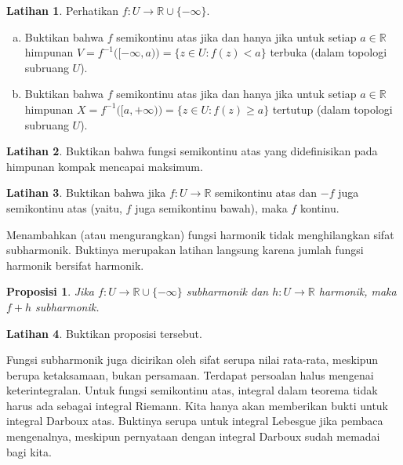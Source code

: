 \documentclass[12pt,openany]{book}
\newcommand{\R}{{\mathbb{R}}}
\theoremstyle{plain}
\newtheorem{prop}[thm]{Proposisi}
\theoremstyle{remark}
\theoremstyle{definition}
\newenvironment{exbox}{%
    \def\FrameCommand{\vrule width 1pt \relax\hspace{10pt}}%
    \MakeFramed{\advance\hsize-\width\FrameRestore}%
}{%
    \endMakeFramed
}
\newenvironment{exparts}{%
    \leavevmode\begin{enumerate}[a),noitemsep,topsep=0pt,parsep=0pt,partopsep=0pt]
}{%
    \end{enumerate}
}
\theoremstyle{exercise}
\newtheorem{exercise}{Latihan}[section]
\theoremstyle{example}
\begin{document}
\begin{exbox}
\begin{exercise}%
\label{exercise:uppersemicontclosedopen}
Perhatikan $f \colon U \to \R \cup \{-\infty\}$.
\begin{exparts}
\item
Buktikan bahwa $f$ semikontinu atas jika dan hanya jika
untuk setiap $a \in \R$
himpunan
$V = f^{-1}\bigl([-\infty,a)\bigr) = \bigl\{ z \in U : f(z) < a \bigr\}$
terbuka (dalam topologi subruang $U$).
\item
Buktikan bahwa $f$ semikontinu atas jika dan hanya jika
untuk setiap $a \in \R$
himpunan
$X = f^{-1}\bigl([a,+\infty)\bigr) = \bigl\{ z \in U : f(z) \geq a \bigr\}$
tertutup (dalam topologi subruang $U$).
\end{exparts}
\end{exercise}

\begin{exercise}%
\label{exercise:uppersemicontmax}
Buktikan bahwa fungsi semikontinu atas yang didefinisikan pada himpunan kompak mencapai maksimum.
\end{exercise}

\begin{exercise}
Buktikan bahwa jika $f \colon U \to \R$ semikontinu atas dan $-f$ juga
semikontinu atas (yaitu, $f$ juga semikontinu bawah), maka $f$
kontinu.
\end{exercise}
\end{exbox}

Menambahkan (atau mengurangkan) 
fungsi harmonik tidak menghilangkan sifat subharmonik.  Buktinya merupakan
latihan langsung
karena jumlah fungsi harmonik bersifat harmonik.

\begin{prop} \label{prop:fplushsubharmonic}
Jika $f \colon U \to \R \cup \{ - \infty \}$ subharmonik dan $h \colon U
\to \R$ harmonik, maka $f+h$ subharmonik.
\end{prop}

\begin{exbox}
\begin{exercise}
Buktikan proposisi tersebut.
\end{exercise}
\end{exbox}

Fungsi subharmonik juga dicirikan oleh sifat serupa nilai rata-rata,
meskipun berupa ketaksamaan, bukan persamaan.  Terdapat persoalan halus
mengenai keterintegralan.  Untuk fungsi semikontinu atas,
integral dalam teorema tidak harus ada sebagai integral Riemann.
Kita hanya akan memberikan bukti untuk integral Darboux atas.
Buktinya 
serupa untuk integral Lebesgue jika pembaca mengenalnya, meskipun
pernyataan dengan integral Darboux sudah memadai bagi kita.
\end{document}
